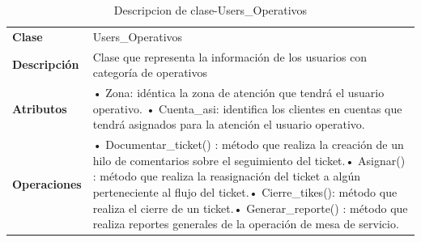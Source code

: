 	\begin{table}[H]
	\centering
	\caption{Descripcion de clase-Users\_Operativos}
	\begin{tabular}{|p{6.145em}|p{28.07em}|}
		\toprule
		\rowcolor[rgb]{ .125,  .216,  .392} \multicolumn{2}{|p{34.215em}|}{\textcolor[rgb]{ 1,  1,  1}{\textbf{Clase Users\_Operativos}}} \\
		\midrule
		\textbf{Clase} & \multicolumn{1}{l|}{Users\_Operativos} \\
		\midrule
		\textbf{Descripción} & Clase que representa la información de los usuarios con categoría de operativos \\
		\midrule
		\textbf{Atributos } & •	Zona: idéntica la zona de atención que tendrá el usuario operativo. \newline{}•	Cuenta\_asi: identifica los clientes en cuentas que tendrá asignados para la atención el usuario operativo. \\
		\midrule
		\textbf{Operaciones} & •	Documentar\_ticket()   :  método que realiza la creación de un hilo de comentarios sobre el seguimiento del ticket.\newline{}•	Asignar() : método que  realiza la reasignación del ticket a algún perteneciente al flujo del ticket.\newline{}•	Cierre\_tikes(): método que realiza el cierre de un ticket.\newline{}•	Generar\_reporte()  : método que realiza reportes generales de la operación de mesa de servicio. \\
		\bottomrule
	\end{tabular}%
	\label{tab:clas9}%
\end{table}%


